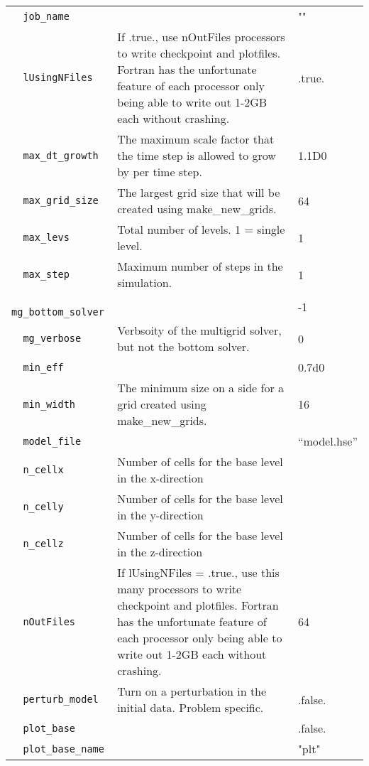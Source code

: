 {\begin{center}
\begin{longtable}{|l|p{3.25in}|l|}
\verb=  job_name =  &   &  "" \\
\verb=  lUsingNFiles =  & If .true., use nOutFiles processors to write checkpoint and 
                               plotfiles.  Fortran has the unfortunate feature of each 
                               processor only being able to write out 
                               1-2GB each without crashing.  &  .true. \\
\verb=  max_dt_growth =  & The maximum scale factor that the time step is allowed to 
                                grow by per time step.  &  1.1D0 \\
\verb=  max_grid_size =  & The largest grid size that will be created using 
                                make\_new\_grids.  &  64 \\
\verb=  max_levs =  & Total number of levels.  1 = single level.  &  1 \\
\verb=  max_step =  & Maximum number of steps in the simulation.  & 1 \\
\verb=  mg_bottom_solver =  &   &  -1 \\
\verb=  mg_verbose =  & Verbsoity of the multigrid solver, but not the bottom solver.  
                          &  0 \\
\verb=  min_eff =  &   &  0.7d0 \\
\verb=  min_width =  & The minimum size on a side  for a grid created using 
                           make\_new\_grids.  &  16 \\
\verb=  model_file =  &   & ``model.hse'' \\
\verb=  n_cellx =  & Number of cells for the base level in the x-direction  &  \\
\verb=  n_celly =  & Number of cells for the base level in the y-direction  &  \\
\verb=  n_cellz =  & Number of cells for the base level in the z-direction  &  \\
\verb=  nOutFiles =  & If lUsingNFiles = .true., use this many processors to write 
                           checkpoint and plotfiles.  Fortran has the unfortunate feature 
                           of each processor only being able to write out 1-2GB each 
                           without crashing.  & 64 \\
\verb=  perturb_model =  & Turn on a perturbation in the initial data.  
                                Problem specific.  &  .false. \\
\verb=  plot_base =  &   & .false. \\
\verb=  plot_base_name =  &   &  "plt" \\

\end{longtable}
\end{center}}
